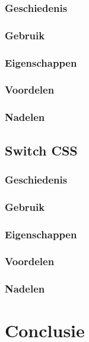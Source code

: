 \documentclass[pdftex,a4paper,12pt,twoside]{report}
\begin{document}
\subsection{Geschiedenis}
\subsection{Gebruik}
\subsection{Eigenschappen}
\subsection{Voordelen}
\subsection{Nadelen}


\section{Switch CSS}
\subsection{Geschiedenis}
\subsection{Gebruik}
\subsection{Eigenschappen}
\subsection{Voordelen}
\subsection{Nadelen}




\chapter{Conclusie}
\label{ch:conclusie}

\lipsum[76-80]










\listoffigures
\listoftables
\end{document}
